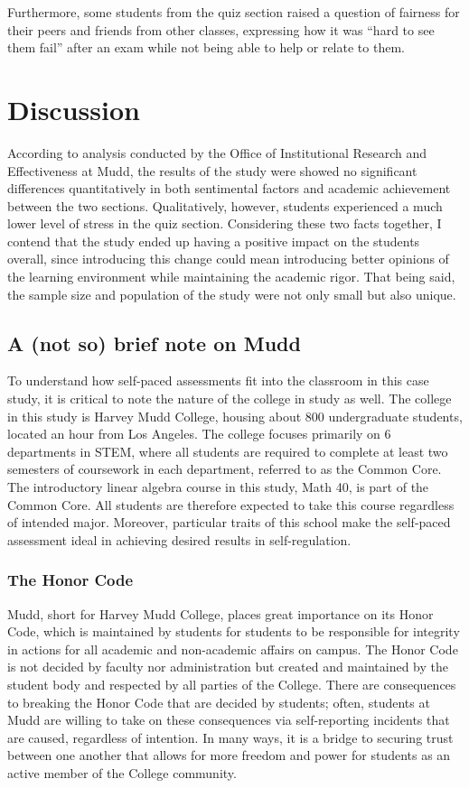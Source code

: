 Furthermore, some students from the quiz section raised a question of fairness for their peers and friends from other classes, expressing how it was ``hard to see them fail'' after an exam while not being able to help or relate to them.

\section{Discussion}

According to analysis conducted by the Office of Institutional Research and Effectiveness at Mudd, the results of the study were showed no significant differences quantitatively in both sentimental factors and academic achievement between the two sections. Qualitatively, however, students experienced a much lower level of stress in the quiz section. Considering these two facts together, I contend that the study ended up having a positive impact on the students overall, since introducing this change could mean introducing better opinions of the learning environment while maintaining the academic rigor. That being said, the sample size and population of the study were not only small but also unique.

\subsection{A (not so) brief note on Mudd}
To understand how self-paced assessments fit into the classroom in this case study, it is critical to note the nature of the college in study as well. The college in this study is Harvey Mudd College, housing about 800 undergraduate students, located an hour from Los Angeles. The college focuses primarily on 6 departments in STEM, where all students are required to complete at least two semesters of coursework in each department, referred to as the Common Core. The introductory linear algebra course in this study, Math 40, is part of the Common Core. All students are therefore expected to take this course regardless of intended major. Moreover, particular traits of this school make the self-paced assessment ideal in achieving desired results in self-regulation.

\subsubsection{The Honor Code}
Mudd, short for Harvey Mudd College, places great importance on its Honor Code, which is maintained by students for students to be responsible for integrity in actions for all academic and non-academic affairs on campus. The Honor Code is not decided by faculty nor administration but created and maintained by the student body and respected by all parties of the College. There are consequences to breaking the Honor Code that are decided by students; often, students at Mudd are willing to take on these consequences via self-reporting incidents that are caused, regardless of intention. In many ways, it is a bridge to securing trust between one another that allows for more freedom and power for students as an active member of the College community.

